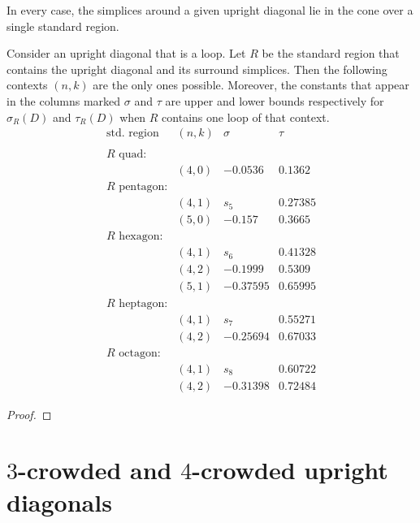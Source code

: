 In every case, the simplices around a given upright diagonal lie
in the cone over a single standard region.

\begin{lemma}\label{lemma:loop:bis}
Consider an upright diagonal that is a loop.  Let $R$ be the
standard region that contains the upright diagonal and its
surround simplices.   Then the following contexts $(n,k)$ are the
only ones possible.  Moreover, the constants that appear in the
columns marked $\sigma$ and $\tau$ are upper and lower bounds
respectively for $\sigma_R(D)$ and $\tau_R(D)$ when $R$ contains
one loop of that context.
    $$
    \begin{array}{llll}
        \text{std. region}&(n,k) &\sigma &\tau \\
        &&&\\
        R \text{ quad:}& & &\\
        &(4,0) &-0.0536 & 0.1362 \\
        R \text{ pentagon:} & & &\\
        &(4,1) &s_5 &0.27385\\
        &(5,0) &-0.157   &0.3665\\
        R \text{ hexagon:} & & &\\
        &(4,1) &s_6 &0.41328\\
        &(4,2) &-0.1999  &0.5309\\
        &(5,1) &-0.37595 &0.65995\\
        R \text{ heptagon:} & & &\\
        &(4,1) &s_7 &0.55271\\
        &(4,2) &-0.25694 &0.67033\\
        R \text{ octagon:} & & &\\
        &(4,1) &s_8 &0.60722\\
        &(4,2) &-0.31398 &0.72484
    \end{array}
    $$
\end{lemma}

\begin{proof} 
\end{proof}

\section{$3$-crowded and $4$-crowded upright diagonals} %
\label{sec:3.9}


